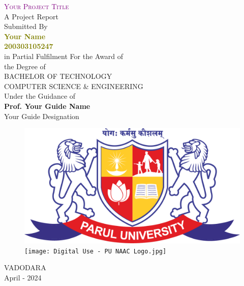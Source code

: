 \thispagestyle{empty}
\begin{center}
\textcolor{purple}{{\huge \textsc{Your Project Title} }}\\
\vspace{1cm}
A Project Report \\
\vspace{0.3cm}
Submitted By\\

\textcolor{olive}{{\huge \bf Your Name}\\ 
{\bf 200303105247}}\\ 

\vspace{0.4cm}
in Partial Fulfilment For the Award of\\
the Degree of\\
BACHELOR OF TECHNOLOGY\\
COMPUTER SCIENCE \& ENGINEERING\\
Under the Guidance of\\
\large{\textbf{Prof. Your Guide Name}}\\
Your Guide Designation\\

\vspace{0.3cm}
\begin{figure}[h]
\begin{center}
     \includegraphics[scale=0.18]{parullogo.png} \\
     \vspace{0.7cm}
     \texttt{[image: Digital Use - PU NAAC Logo.jpg]}
\end{center}
\end{figure}
VADODARA\\
April - 2024
\end{center}
